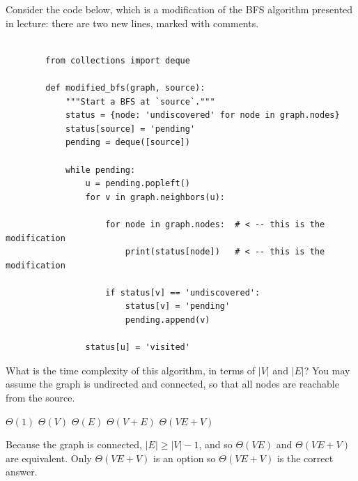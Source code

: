 \begin{prob}

    Consider the code below, which is a modification of the BFS algorithm
    presented in lecture: there are two new lines, marked with comments.

    \begin{verbatim}

        from collections import deque

        def modified_bfs(graph, source):
            """Start a BFS at `source`."""
            status = {node: 'undiscovered' for node in graph.nodes}
            status[source] = 'pending'
            pending = deque([source])

            while pending:
                u = pending.popleft()
                for v in graph.neighbors(u):

                    for node in graph.nodes:  # < -- this is the modification
                        print(status[node])   # < -- this is the modification

                    if status[v] == 'undiscovered':
                        status[v] = 'pending'
                        pending.append(v)

                status[u] = 'visited'
    \end{verbatim}

    What is the time complexity of this algorithm, in terms of $|V|$ and $|E|$?
    You may assume the graph is undirected and connected, so that all nodes are
    reachable from the source.

    \begin{choices}
        \choice $\Theta(1)$
        \choice $\Theta(V)$
        \choice $\Theta(E)$
        \choice $\Theta(V + E)$
        \correctchoice $\Theta(V E + V)$
    \end{choices}

    \begin{soln}
        Because the graph is connected, $|E| \geq |V| - 1$, and so $\Theta(VE)$ and $\Theta(VE + V)$ are equivalent. Only $\Theta(VE + V)$ is an option so $\Theta(VE + V)$ is the correct answer.
    \end{soln}

\end{prob}
